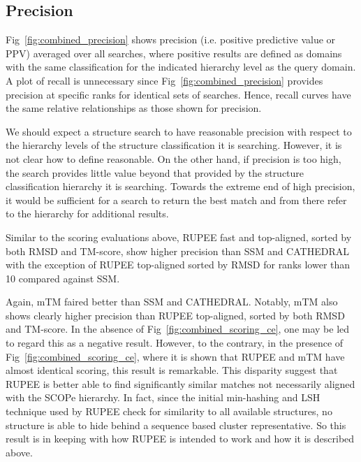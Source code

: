 \documentclass[10pt,letterpaper]{article}
\renewcommand{\figurename}{Fig}
\begin{document}
\subsection*{Precision}

\figurename~\ref{fig:combined_precision} shows precision (i.e. positive predictive value or PPV) averaged over all searches, where positive results are defined as domains with the same classification for the indicated hierarchy level as the query domain. 
A plot of recall is unnecessary since \figurename~\ref{fig:combined_precision} provides precision at specific ranks for identical sets of searches. 
Hence, recall curves have the same relative relationships as those shown for precision. 

\begin{figure*}[!h]
\caption{Precision for RUPEE fast, RUPEE top-aligned sorted by TM-score, and RUPEE top-aligned sorted by RMSD}
\label{fig:combined_precision}
\end{figure*}

We should expect a structure search to have reasonable precision with respect to the hierarchy levels of the structure classification it is searching. 
However, it is not clear how to define reasonable. 
On the other hand, if precision is too high, the search provides little value beyond that provided by the structure classification hierarchy it is searching. 
Towards the extreme end of high precision, it would be sufficient for a search to return the best match and from there refer to the hierarchy for additional results. 

Similar to the scoring evaluations above, RUPEE fast and top-aligned, sorted by both RMSD and TM-score, show higher precision than SSM and CATHEDRAL with the exception of RUPEE top-aligned sorted by RMSD for ranks lower than 10 compared against SSM. 

Again, mTM faired better than SSM and CATHEDRAL. 
Notably, mTM also shows clearly higher precision than RUPEE top-aligned, sorted by both RMSD and TM-score. 
In the absence of \figurename~\ref{fig:combined_scoring_ce}, one may be led to regard this as a negative result. 
However, to the contrary, in the presence of \figurename~\ref{fig:combined_scoring_ce}, where it is shown that RUPEE and mTM have almost identical scoring, this result is remarkable. 
This disparity suggest that RUPEE is better able to find significantly similar matches not necessarily aligned with the SCOPe hierarchy. 
In fact, since the initial min-hashing and LSH technique used by RUPEE check for similarity to all available structures, no structure is able to hide behind a sequence based cluster representative. 
So this result is in keeping with how RUPEE is intended to work and how it is described above. 
\end{document}

